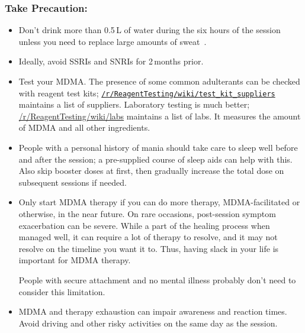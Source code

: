 \documentclass[11pt,oneside]{book}
\newcommand{\mdcite}[1]{}
\newcommand{\mdonly}[1]{}
\begin{document}
\subsubsection*{Take Precaution:}
\begin{itemize}
    \item Don't drink more than 0.5\,L of water during the six hours of the session unless you need to replace large amounts of sweat~\mdcite{myBook}.
    \item Ideally, avoid SSRIs and SNRIs for 2\,months prior.
    \item Test your MDMA. The presence of some common adulterants can be checked with reagent test kits; \href{https://www.reddit.com/r/ReagentTesting/wiki/test\_kit\_suppliers}{\nolinkurl{/r/ReagentTesting/wiki/test\_kit\_suppliers}} maintains a list of suppliers. Laboratory testing is much better; \href{https://www.reddit.com/r/ReagentTesting/wiki/labs}{/r/ReagentTesting/wiki/labs} maintains a list of labs. It measures the amount of MDMA and all other ingredients.
    \item People with a personal history of mania should take care to sleep well before and after the session; a pre-supplied course of sleep aids can help with this. Also skip booster doses at first, then gradually increase the total dose on subsequent sessions if needed.
    \item Only start MDMA therapy if you can do more therapy, MDMA-facilitated or otherwise, in the near future. On rare occasions, post-session symptom exacerbation can be severe. While a part of the healing process when managed well, it can require a lot of therapy to resolve, and it may not resolve on the timeline you want it to. Thus, having slack in your life is important for MDMA therapy.
    
    People with secure attachment and no mental illness probably don't need to consider this limitation.
    \item MDMA and therapy exhaustion can impair awareness and reaction times. Avoid driving and other risky activities on the same day as the session.
\end{itemize}

\mdonly{Written by Mark Groeneveld (u/night81) based on a draft of their book \textit{Open MDMA: An Evidence-Based Synthesis, Theory, and Manual for MDMA Therapy Based on Memory Reconsolidation, Complex Systems, and the Defense Cascade} (\href{https://www.doi.org/10.31234/osf.io/aps5g}{doi.org/10.31234/osf.io/aps5g}) and feedback from /r/mdmatherapy.

Please comment or DM if you spot any errors or have any suggestions!}
\end{document}
